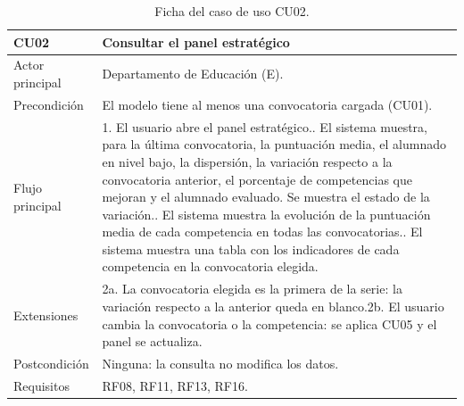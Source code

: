 \documentclass[12pt, a4paper, oneside]{report}
\begin{document}
\begin{table}[!tbp]
\centering
\small
{}\renewcommand{\arraystretch}{1.1}
\begin{tabularx}{\textwidth}{@{} >{\raggedright\arraybackslash}p{2.8cm} X @{}}
\toprule
\textbf{CU02} & \textbf{Consultar el panel estratégico} \\ \midrule
Actor principal & Departamento de Educación (E). \\ \addlinespace
Precondición & El modelo tiene al menos una convocatoria cargada (CU01). \\ \addlinespace
Flujo principal & 1. El usuario abre el panel estratégico.\newline 2. El sistema muestra, para la última convocatoria, la puntuación media, el alumnado en nivel bajo, la dispersión, la variación respecto a la convocatoria anterior, el porcentaje de competencias que mejoran y el alumnado evaluado. Se muestra el estado de la variación.\newline 3. El sistema muestra la evolución de la puntuación media de cada competencia en todas las convocatorias.\newline 4. El sistema muestra una tabla con los indicadores de cada competencia en la convocatoria elegida. \\ \addlinespace
Extensiones & 2a. La convocatoria elegida es la primera de la serie: la variación respecto a la anterior queda en blanco.\newline 2b. El usuario cambia la convocatoria o la competencia: se aplica CU05 y el panel se actualiza. \\ \addlinespace
Postcondición & Ninguna: la consulta no modifica los datos. \\ \addlinespace
Requisitos & RF08, RF11, RF13, RF16. \\ \bottomrule
\end{tabularx}
\caption{Ficha del caso de uso CU02.}
\label{tab:cu02}
\end{table}
\end{document}
